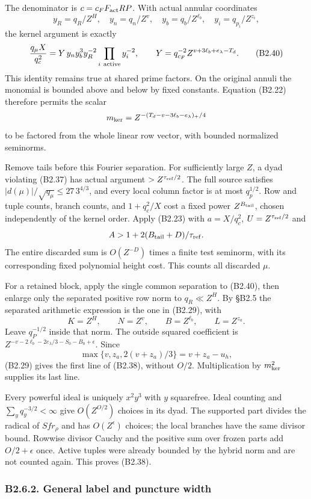 \documentclass[11pt,a4paper]{article}
\begin{document}
The denominator is \(c=c_FF_{\rm act}RP\). With actual annular
coordinates \[
y_R=q_R/Z^H,\quad y_n=q_n/Z^v,\quad
y_b=q_b/Z^{\ell_b},\quad y_i=q_{p_i}/Z^{z_i},
\] the kernel argument is exactly \[
\frac{q_\mu X}{q_c^2}
=Y\,y_ny_b^3y_R^{-2}\prod_{i\ {\rm active}}y_i^{-2},
\qquad
Y=q_{c_F}^{-2}Z^{v+3\ell_b+e_\lambda-T_d}.
\tag{B2.40}
\] This identity remains true at shared prime factors. On the original
annuli the monomial is bounded above and below by fixed constants.
Equation (B2.22) therefore permits the scalar \[
m_{\rm ker}=Z^{-(T_d-v-3\ell_b-e_\lambda)_+/4}
\] to be factored from the whole linear row vector, with bounded
normalized seminorms.

Remove tails before this Fourier separation. For sufficiently large
\(Z\), a dyad violating (B2.37) has actual argument
\(>Z^{\tau_{\rm ref}/2}\). The full source satisfies
\(|d(\mu)|/\sqrt{q_\mu}\le27\,\allowbreak{}3^{4/3}\), and every local column factor
is at most \(q_p^{1/2}\). Row and tuple counts, branch counts, and
\(1+q_c^2/X\) cost a fixed power \(Z^{B_{\rm tail}}\), chosen
independently of the kernel order. Apply (B2.23) with \(a=X/q_c^2\),
\(U=Z^{\tau_{\rm ref}/2}\) and \[
A>1+2(B_{\rm tail}+D)/\tau_{\rm ref}.
\] The entire discarded sum is \(O(Z^{-D})\) times a finite test
seminorm, with its corresponding fixed polynomial height cost. This
counts all discarded \(\mu\).

For a retained block, apply the single common separation to (B2.40),
then enlarge only the separated positive row norm to \(q_R\ll Z^H\). By
§B2.5 the separated arithmetic expression is the one in (B2.29), with \[
K=Z^H,\qquad N=Z^v,\qquad B=Z^{\ell_b},\qquad L=Z^{z_a}.
\] Leave \(q_P^{-1/2}\) inside that norm. The outside squared
coefficient is \(Z^{-v-2\ell_b-2e_\lambda/3-S_0-B_0+\epsilon}\). Since
\[
\max\{v,z_a,2(v+z_a)/3\}=v+z_a-u_h,
\] (B2.29) gives the first line of (B2.38), without \(O/2\).
Multiplication by \(m_{\rm ker}^2\) supplies its last line.

Every powerful ideal is uniquely \(x^2y^3\) with \(y\) squarefree. Ideal
counting and \(\sum_yq_y^{-3/2}<\infty\) give \(O(Z^{O/2})\) choices in
its dyad. The supported part divides the radical of \(Sfr_\rho\) and has
\(O(Z^\epsilon)\) choices; the local branches have the same divisor
bound. Rowwise divisor Cauchy and the positive sum over frozen parts add
\(O/2+\epsilon\) once. Active tuples were already bounded by the hybrid
norm and are not counted again. This proves (B2.38).

\hypertarget{b2.6.2.-general-label-and-puncture-width}{%
\subsubsection{B2.6.2. General label and puncture
width}\label{b2.6.2.-general-label-and-puncture-width}}
\end{document}
